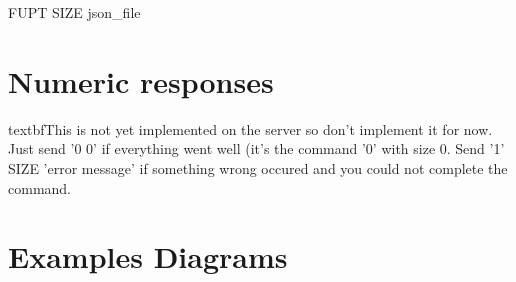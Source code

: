 \documentclass{article}
\begin{document}
\begin{center}FUPT SIZE json\_file\end{center}

\section{Numeric responses}

textbf{This is not yet implemented on the server so don't implement it for now.}
Just send '0 0' if everything went well (it's the command '0' with size 0. Send '1' SIZE 'error message' if something wrong occured and you could not complete the command.

\section{Examples Diagrams}


\end{document}
